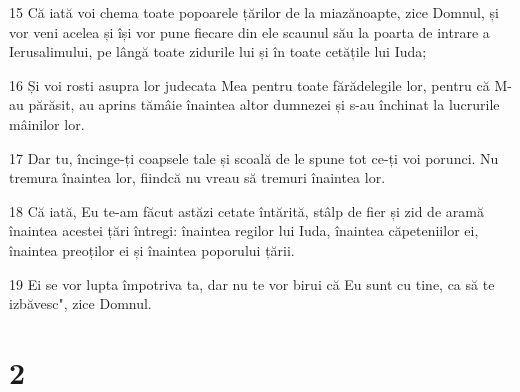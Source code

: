 \par 15 Că iată voi chema toate popoarele țărilor de la miazănoapte, zice Domnul, și vor veni acelea și își vor pune fiecare din ele scaunul său la poarta de intrare a Ierusalimului, pe lângă toate zidurile lui și în toate cetățile lui Iuda;
\par 16 Și voi rosti asupra lor judecata Mea pentru toate fărădelegile lor, pentru că M-au părăsit, au aprins tămâie înaintea altor dumnezei și s-au închinat la lucrurile mâinilor lor.
\par 17 Dar tu, încinge-ți coapsele tale și scoală de le spune tot ce-ți voi porunci. Nu tremura înaintea lor, fiindcă nu vreau să tremuri înaintea lor.
\par 18 Că iată, Eu te-am făcut astăzi cetate întărită, stâlp de fier și zid de aramă înaintea acestei țări întregi: înaintea regilor lui Iuda, înaintea căpeteniilor ei, înaintea preoților ei și înaintea poporului țării.
\par 19 Ei se vor lupta împotriva ta, dar nu te vor birui că Eu sunt cu tine, ca să te izbăvesc", zice Domnul.

\chapter{2}

